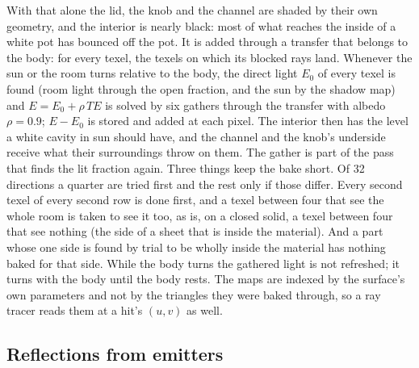 \documentclass[journal]{IEEEtran}
\begin{document}
With that alone the lid, the knob and the channel are shaded by their
own geometry, and the interior is nearly black: most of what reaches the
inside of a white pot has bounced off the pot. It is added through a transfer
that belongs to the body: for every texel, the texels on which its
blocked rays land. Whenever the sun or the room turns relative to the body,
the direct light $E_0$ of every texel is found (room light through the
open fraction, and the sun by the shadow map) and
$E=E_0+\rho\,T E$ is solved by six gathers through the transfer with
albedo $\rho=0.9$; $E-E_0$ is stored and added at each pixel. The
interior then has the level a white cavity in sun should have, and the
channel and the knob's underside receive what their surroundings throw
on them. The gather is part of the pass that finds the lit fraction
again. Three things keep the bake short. Of 32 directions a quarter are tried first and the rest only if
those differ. Every second texel of every second row is done first, and
a texel between four that see the whole room is taken to see it too, as
is, on a closed solid, a texel between four that see nothing (the side
of a sheet that is inside the material). And a part whose one side is
found by trial to be wholly inside the material has nothing baked for
that side. While the body turns the
gathered light is not refreshed; it turns with the body until the body
rests. The maps are indexed by the surface's own parameters and not by
the triangles they were baked through, so a ray tracer reads them at a
hit's $(u,v)$ as well.

\subsection{Reflections from emitters}
\end{document}

